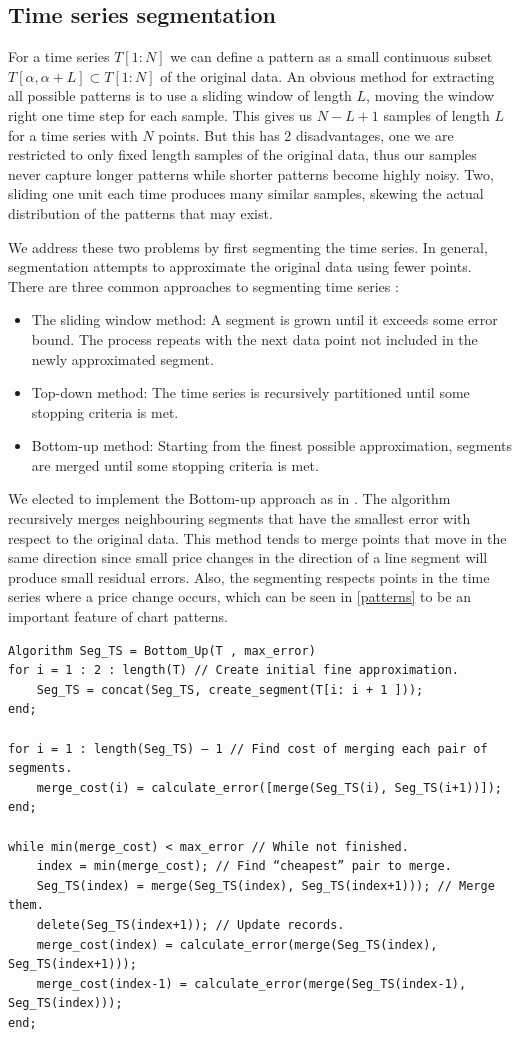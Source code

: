 \documentclass{article} %
\begin{document}
\subsection{Time series segmentation}
For a time series $T[1:N]$ we can define a pattern as a small continuous subset $T[\alpha,\alpha+L] \subset T[1:N]$ of the original data. An obvious method for extracting all possible patterns is to use a sliding window of length $L$, moving the window right one time step for each sample. This gives us $N-L+1$ samples of length $L$ for a time series with $N$ points. But this has 2 disadvantages, one we are restricted to only fixed length samples of the original data, thus our samples never capture longer patterns while shorter patterns become highly noisy. Two, sliding one unit each time produces many similar samples, skewing the actual distribution of the patterns that may exist.

We address these two problems by first segmenting the time series. In general, segmentation attempts to approximate the original data using fewer points. There are three common approaches to segmenting time series \cite{Keogh93segmentingtime}:
\begin{itemize}
\item The sliding window method: A segment is grown until it exceeds some error bound. The process
repeats with the next data point not included in the newly approximated segment.
\item Top-down method: The time series is recursively partitioned until some stopping criteria is met.
\item Bottom-up method: Starting from the finest possible approximation, segments are merged until
some stopping criteria is met.
\end{itemize}
We elected to implement the Bottom-up approach as in \cite{Guo07recognizingstock}. The algorithm recursively merges neighbouring segments that have the smallest error with respect to the original data. This method tends to merge points that move in the same direction since small price changes in the direction of a line segment will produce small residual errors. Also, the segmenting respects points in the time series where a price change occurs, which can be seen in \ref{patterns} to be an important feature of chart patterns. 

\begin{Verbatim}
Algorithm Seg_TS = Bottom_Up(T , max_error)
for i = 1 : 2 : length(T) // Create initial fine approximation.
    Seg_TS = concat(Seg_TS, create_segment(T[i: i + 1 ]));
end;

for i = 1 : length(Seg_TS) – 1 // Find cost of merging each pair of segments.
    merge_cost(i) = calculate_error([merge(Seg_TS(i), Seg_TS(i+1))]);
end;

while min(merge_cost) < max_error // While not finished.
    index = min(merge_cost); // Find “cheapest” pair to merge.
    Seg_TS(index) = merge(Seg_TS(index), Seg_TS(index+1))); // Merge them.
    delete(Seg_TS(index+1)); // Update records.
    merge_cost(index) = calculate_error(merge(Seg_TS(index), Seg_TS(index+1)));
    merge_cost(index-1) = calculate_error(merge(Seg_TS(index-1), Seg_TS(index)));
end;
\end{Verbatim}
\end{document}
